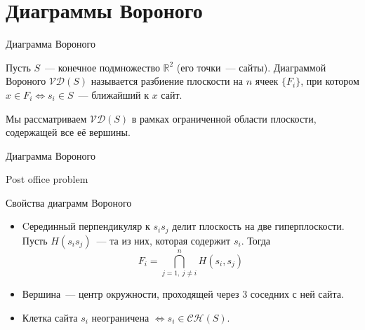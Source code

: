 \section{Диаграммы Вороного}

    \begin{frame}{Диаграмма Вороного}

        \begin{defn}

            Пусть $S$~--- конечное подмножество $\mathbb{R}^2$ (его точки~--- \alert{сайты}).
            Диаграммой Вороного $\mathcal{V}\mathcal{D}(S)$ называется разбиение плоскости на $n$ ячеек $\{ F_i \}$, при котором $x \in F_i
            \Leftrightarrow s_i \in S$~--- ближайший к $x$ \alert{сайт}.

        \end{defn}

        Мы рассматриваем $\mathcal{V}\mathcal{D}(S)$ в рамках ограниченной области плоскости, содержащей все её
        вершины.

    \end{frame}

    \begin{frame}{Диаграмма Вороного}
        
        \begin{center}


        \end{center}

        
    \end{frame}

    \begin{frame}{Post office problem}
    \vspace{-17.5mm}
    \begin{center}


    \end{center}

    \end{frame}

    \begin{frame}{Свойства диаграмм Вороного}

        \begin{itemize}

            \item Cерединный перпендикуляр к $s_i s_j$ делит плоскость на две гиперплоскости. Пусть $H(s_i s_j)$~--- та из них, которая содержит $s_i$.
                  Тогда
                  \[ F_i = \bigcap\limits_{j = 1, \ j \neq i}^{n} H(s_i, s_j)\]

            \item Вершина~--- центр окружности, проходящей через 3 соседних с ней сайта.

            \item Клетка сайта $s_i$ неограничена $\Leftrightarrow s_i \in \mathcal{C}\mathcal{H}(S)$.

        \end{itemize}

    \end{frame}

